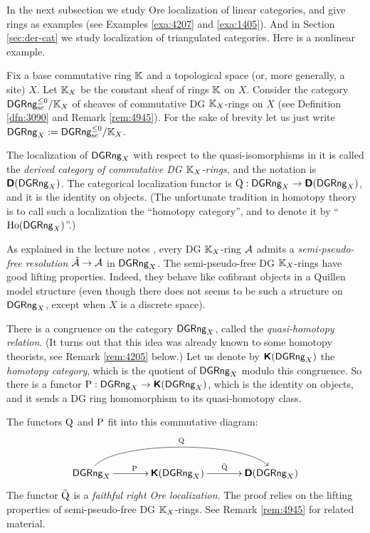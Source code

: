 In the next subsection we study Ore localization of linear categories, and give 
rings as examples (see Examples \ref{exa:4207} and \ref{exa:1405}). And in 
Section \ref{sec:der-cat} we study localization of triangulated categories. 
Here is a nonlinear example. 

\begin{exa} \label{exa:4205}
Fix a base commutative ring $\K$ and a topological space (or, more generally, a 
site) $X$. Let $\K_X$ be the constant sheaf of rings $\K$ on $X$.
Consider the category
$\catt{DGRng}^{\leq 0}_{\mrm{sc}} / \K_X$
of sheaves of commutative DG $\K_X$-rings on $X$ (see Definition 
\ref{dfn:3090} and Remark \ref{rem:4945}). For the sake of brevity let us 
just write 
$\catt{DGRng}_{X} := \catt{DGRng}^{\leq 0}_{\mrm{sc}} / \K_X$.
 
The localization of $\catt{DGRng}_X$ with respect to the quasi-isomorphisms in 
it is called the {\em derived category of commutative DG $\K_X$-rings}, and the 
notation is $\dcat{D}(\catt{DGRng}_X)$. 
The categorical localization functor is 
$\opn{Q} : \catt{DGRng}_X \to \dcat{D}(\catt{DGRng}_X)$,
and it is the identity on objects. 
(The unfortunate tradition in homotopy theory is to call such a localization 
the ``homotopy category'', and to denote it by 
``$\opn{Ho}(\catt{DGRng}_X)$''.)

As explained in the lecture notes \cite{Ye15}, every DG $\K_X$-ring $\AA$ 
admits a {\em semi-pseudo-free resolution} $\til{\AA} \to \AA$ in 
$\catt{DGRng}_X$. The semi-pseudo-free DG $\K_X$-rings have good lifting 
properties. Indeed, they behave like cofibrant objects in a Quillen model 
structure (even though there does not seems to be such a structure on 
$\catt{DGRng}_X$, except when $X$ is a discrete space).

There is a congruence on the category $\catt{DGRng}_X$, called the {\em 
quasi-homotopy relation}. (It turns out that this idea was already known to some 
homotopy theorists, see Remark \ref{rem:4205} below.) Let us denote by 
$\dcat{K}(\catt{DGRng}_X)$ the {\em homotopy category}, which is the 
quotient of $\catt{DGRng}_X$ modulo this congruence. So there is a functor 
$\opn{P} : \catt{DGRng}_X \to \dcat{K}(\catt{DGRng}_X)$,
which is the identity on objects, and it sends a DG ring homomorphism to its 
quasi-homotopy class. 

The functors $\opn{Q}$ and $\opn{P}$ fit into this commutative diagram:
\begin{equation} \label{eqn:4913}
\UseTips \xymatrix @C=8ex @R=6ex {
\catt{DGRng}_X
\ar[r]^{\opn{P}}
\ar@(u,u)[rr]^{\opn{Q}}
&
\dcat{K}(\catt{DGRng}_X)
\ar[r]^{\bar{\opn{Q}}}
&
\dcat{D}(\catt{DGRng}_X)
}
\end{equation}
The functor $\bar{\opn{Q}}$ is a {\em faithful right Ore localization}. 
The proof relies on the lifting properties of semi-pseudo-free DG $\K_X$-rings. 
See Remark \ref{rem:4945} for related material. 
\end{exa}

